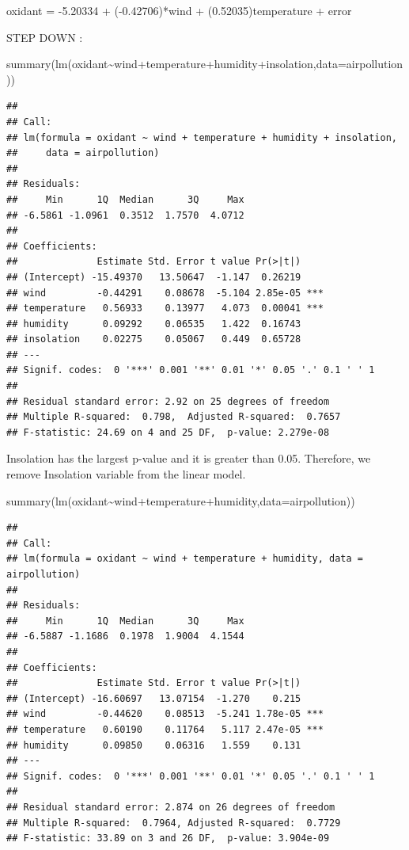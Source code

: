 \documentclass[
]{article}
\newenvironment{Shaded}{\begin{snugshade}}{\end{snugshade}}
\newcommand{\AttributeTok}[1]{\textcolor[rgb]{0.77,0.63,0.00}{#1}}
\newcommand{\FunctionTok}[1]{\textcolor[rgb]{0.00,0.00,0.00}{#1}}
\newcommand{\NormalTok}[1]{#1}
\newcommand{\SpecialCharTok}[1]{\textcolor[rgb]{0.00,0.00,0.00}{#1}}
\begin{document}
oxidant = -5.20334 + (-0.42706)*wind + (0.52035)temperature + error

STEP DOWN :

\begin{Shaded}
\begin{Highlighting}[]
\FunctionTok{summary}\NormalTok{(}\FunctionTok{lm}\NormalTok{(oxidant}\SpecialCharTok{\textasciitilde{}}\NormalTok{wind}\SpecialCharTok{+}\NormalTok{temperature}\SpecialCharTok{+}\NormalTok{humidity}\SpecialCharTok{+}\NormalTok{insolation,}\AttributeTok{data=}\NormalTok{airpollution))}
\end{Highlighting}
\end{Shaded}

\begin{verbatim}
## 
## Call:
## lm(formula = oxidant ~ wind + temperature + humidity + insolation, 
##     data = airpollution)
## 
## Residuals:
##     Min      1Q  Median      3Q     Max 
## -6.5861 -1.0961  0.3512  1.7570  4.0712 
## 
## Coefficients:
##              Estimate Std. Error t value Pr(>|t|)    
## (Intercept) -15.49370   13.50647  -1.147  0.26219    
## wind         -0.44291    0.08678  -5.104 2.85e-05 ***
## temperature   0.56933    0.13977   4.073  0.00041 ***
## humidity      0.09292    0.06535   1.422  0.16743    
## insolation    0.02275    0.05067   0.449  0.65728    
## ---
## Signif. codes:  0 '***' 0.001 '**' 0.01 '*' 0.05 '.' 0.1 ' ' 1
## 
## Residual standard error: 2.92 on 25 degrees of freedom
## Multiple R-squared:  0.798,  Adjusted R-squared:  0.7657 
## F-statistic: 24.69 on 4 and 25 DF,  p-value: 2.279e-08
\end{verbatim}

Insolation has the largest p-value and it is greater than 0.05.
Therefore, we remove Insolation variable from the linear model.

\begin{Shaded}
\begin{Highlighting}[]
\FunctionTok{summary}\NormalTok{(}\FunctionTok{lm}\NormalTok{(oxidant}\SpecialCharTok{\textasciitilde{}}\NormalTok{wind}\SpecialCharTok{+}\NormalTok{temperature}\SpecialCharTok{+}\NormalTok{humidity,}\AttributeTok{data=}\NormalTok{airpollution))}
\end{Highlighting}
\end{Shaded}

\begin{verbatim}
## 
## Call:
## lm(formula = oxidant ~ wind + temperature + humidity, data = airpollution)
## 
## Residuals:
##     Min      1Q  Median      3Q     Max 
## -6.5887 -1.1686  0.1978  1.9004  4.1544 
## 
## Coefficients:
##              Estimate Std. Error t value Pr(>|t|)    
## (Intercept) -16.60697   13.07154  -1.270    0.215    
## wind         -0.44620    0.08513  -5.241 1.78e-05 ***
## temperature   0.60190    0.11764   5.117 2.47e-05 ***
## humidity      0.09850    0.06316   1.559    0.131    
## ---
## Signif. codes:  0 '***' 0.001 '**' 0.01 '*' 0.05 '.' 0.1 ' ' 1
## 
## Residual standard error: 2.874 on 26 degrees of freedom
## Multiple R-squared:  0.7964, Adjusted R-squared:  0.7729 
## F-statistic: 33.89 on 3 and 26 DF,  p-value: 3.904e-09
\end{verbatim}
\end{document}
